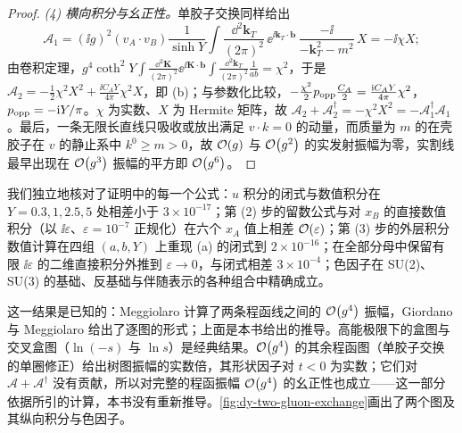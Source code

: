 \begin{proof}
\emph{(4) 横向积分与幺正性。}单胶子交换同样给出
\[
\mathcal A_1=(\ii g)^2(v_A\cdot v_B)\frac{1}{\sinh Y}\int\frac{\dd^2\mathbf k_T}{(2\pi)^2}\,\ee^{\ii\mathbf k_T\cdot\boldsymbol b}\,\frac{-\ii}{-\mathbf k_T^2-m^2}\,X=-\ii\chi X ;
\]
由卷积定理，$g^4\coth^2Y\int\frac{\dd^2\mathbf K}{(2\pi)^2}\ee^{\ii\mathbf K\cdot\boldsymbol b}\int\frac{\dd^2\mathbf k_T}{(2\pi)^2}\frac{1}{ab}=\chi^2$，于是 $\mathcal A_2=-\frac12\chi^2X^2+\frac{\ii C_AY}{4\pi}\chi^2X$，即 (b)；与参数化比较，$-\frac{\chi^2}{2}p_{\rm opp}\frac{C_A}{2}=\frac{\mathrm{i} C_AY}{4\pi}\chi^2$，$p_{\rm opp}=-\mathrm{i} Y/\pi$。$\chi$ 为实数、$X$ 为 Hermite 矩阵，故 $\mathcal A_2+\mathcal A_2^\dagger=-\chi^2X^2=-\mathcal A_1^\dagger\mathcal A_1$。最后，一条无限长直线只吸收或放出满足 $v\cdot k=0$ 的动量，而质量为 $m$ 的在壳胶子在 $v$ 的静止系中 $k^0\ge m>0$，故 $\mathcal{O}\!\left(g\right)$ 与 $\mathcal{O}\!\left(g^2\right)$ 的实发射振幅为零，实割线最早出现在 $\mathcal{O}\!\left(g^3\right)$ 振幅的平方即 $\mathcal{O}\!\left(g^6\right)$。
\end{proof}

我们独立地核对了证明中的每一个公式：$u$ 积分的闭式与数值积分在 $Y=0.3,1,2.5,5$ 处相差小于 $3\times10^{-17}$；第 (2) 步的留数公式与对 $x_B$ 的直接数值积分（以 $\ii\varepsilon$、$\varepsilon=10^{-7}$ 正规化）在六个 $x_A$ 值上相差 $\mathcal{O}\!\left(\varepsilon\right)$；第 (3) 步的外层积分数值计算在四组 $(a,b,Y)$ 上重现 (a) 的闭式到 $2\times10^{-16}$；在全部分母中保留有限 $\ii\varepsilon$ 的二维直接积分外推到 $\varepsilon\to0$，与闭式相差 $3\times10^{-4}$；色因子在 SU(2)、SU(3) 的基础、反基础与伴随表示的各种组合中精确成立。

这一结果是已知的：Meggiolaro 计算了两条程函线之间的 $\mathcal{O}\!\left(g^4\right)$ 振幅\cite[第~3~节，式~(3.23)--(3.26)、(3.34)、(3.36)]{Meggiolaro:1996hf}，Giordano 与 Meggiolaro 给出了逐图的形式\cite[式~(4.24)]{Giordano:2006vv}；上面是本书给出的推导。高能极限下的盒图与交叉盒图（$\ln(-s)$ 与 $\ln s$）是经典结果\cite{Cheng:1969eh,Korchemskaya:1994qp,Korchemsky:1993hr,Caron-Huot:2013fea}。$\mathcal{O}\!\left(g^4\right)$ 的其余程函图（单胶子交换的单圈修正）给出树图振幅的实数倍，其形状因子对 $t<0$ 为实数\cite[式~(3.28)--(3.34)]{Meggiolaro:1996hf}；它们对 $\mathcal A+\mathcal A^\dagger$ 没有贡献，所以对完整的程函振幅 $\mathcal{O}\!\left(g^4\right)$ 的幺正性也成立——这一部分依据所引的计算，本书没有重新推导。\cref{fig:dy-two-gluon-exchange}画出了两个图及其纵向积分与色因子。

